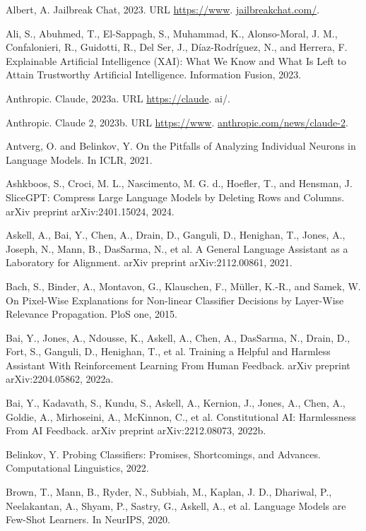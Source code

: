 \documentclass[10pt]{article}
\begin{document}
Albert, A. Jailbreak Chat, 2023. URL \href{https://www}{https://www}. \href{http://jailbreakchat.com/}{jailbreakchat.com/}.

Ali, S., Abuhmed, T., El-Sappagh, S., Muhammad, K., Alonso-Moral, J. M., Confalonieri, R., Guidotti, R., Del Ser, J., Díaz-Rodríguez, N., and Herrera, F. Explainable Artificial Intelligence (XAI): What We Know and What Is Left to Attain Trustworthy Artificial Intelligence. Information Fusion, 2023.

Anthropic. Claude, 2023a. URL \href{https://claude}{https://claude}. ai/.

Anthropic. Claude 2, 2023b. URL \href{https://www}{https://www}. \href{http://anthropic.com/news/claude-2}{anthropic.com/news/claude-2}.

Antverg, O. and Belinkov, Y. On the Pitfalls of Analyzing Individual Neurons in Language Models. In ICLR, 2021.

Ashkboos, S., Croci, M. L., Nascimento, M. G. d., Hoefler, T., and Hensman, J. SliceGPT: Compress Large Language Models by Deleting Rows and Columns. arXiv preprint arXiv:2401.15024, 2024.

Askell, A., Bai, Y., Chen, A., Drain, D., Ganguli, D., Henighan, T., Jones, A., Joseph, N., Mann, B., DasSarma, N., et al. A General Language Assistant as a Laboratory for Alignment. arXiv preprint arXiv:2112.00861, 2021.

Bach, S., Binder, A., Montavon, G., Klauschen, F., Müller, K.-R., and Samek, W. On Pixel-Wise Explanations for Non-linear Classifier Decisions by Layer-Wise Relevance Propagation. PloS one, 2015.

Bai, Y., Jones, A., Ndousse, K., Askell, A., Chen, A., DasSarma, N., Drain, D., Fort, S., Ganguli, D., Henighan, T., et al. Training a Helpful and Harmless Assistant With Reinforcement Learning From Human Feedback. arXiv preprint arXiv:2204.05862, 2022a.

Bai, Y., Kadavath, S., Kundu, S., Askell, A., Kernion, J., Jones, A., Chen, A., Goldie, A., Mirhoseini, A., McKinnon, C., et al. Constitutional AI: Harmlessness From AI Feedback. arXiv preprint arXiv:2212.08073, 2022b.

Belinkov, Y. Probing Classifiers: Promises, Shortcomings, and Advances. Computational Linguistics, 2022.

Brown, T., Mann, B., Ryder, N., Subbiah, M., Kaplan, J. D., Dhariwal, P., Neelakantan, A., Shyam, P., Sastry, G., Askell, A., et al. Language Models are Few-Shot Learners. In NeurIPS, 2020.
\end{document}
